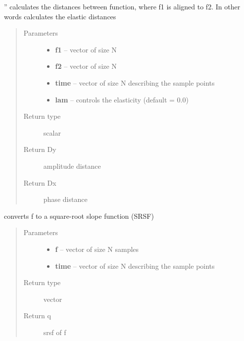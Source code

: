\documentclass[letterpaper,10pt,english]{sphinxmanual}
\begin{document}
\begin{fulllineitems}
\label{utility_functions:utility_functions.elastic_distance}
''
calculates the distances between function, where f1 is aligned to f2. In other words
calculates the elastic distances
\begin{quote}\begin{description}
\item[{Parameters}] \leavevmode\begin{itemize}
\item {} 
\textbf{f1} -- vector of size N

\item {} 
\textbf{f2} -- vector of size N

\item {} 
\textbf{time} -- vector of size N describing the sample points

\item {} 
\textbf{lam} -- controls the elasticity (default = 0.0)

\end{itemize}

\item[{Return type}] \leavevmode
scalar

\item[{Return Dy}] \leavevmode
amplitude distance

\item[{Return Dx}] \leavevmode
phase distance

\end{description}\end{quote}

\end{fulllineitems}


\begin{fulllineitems}
\label{utility_functions:utility_functions.f_to_srsf}
converts f to a square-root slope function (SRSF)
\begin{quote}\begin{description}
\item[{Parameters}] \leavevmode\begin{itemize}
\item {} 
\textbf{f} -- vector of size N samples

\item {} 
\textbf{time} -- vector of size N describing the sample points

\end{itemize}

\item[{Return type}] \leavevmode
vector

\item[{Return q}] \leavevmode
srsf of f

\end{description}\end{quote}

\end{fulllineitems}
\end{document}
